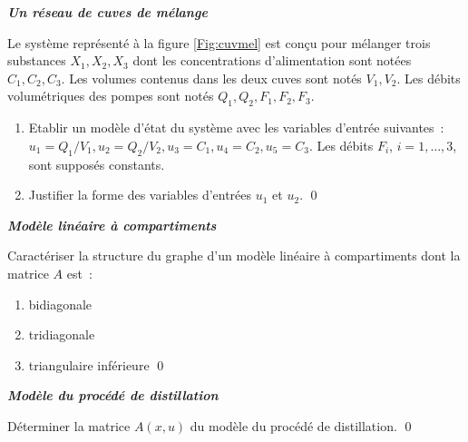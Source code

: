 \begin{exercice}{\bf \em Un réseau de cuves de mélange}

Le système représenté à la figure \ref{Fig:cuvmel} est con\c cu pour
mélanger trois substances $X_1, X_2, X_3$ dont les concentrations
d'alimentation sont notées $C_1, C_2, C_3$. Les volumes contenus
dans les deux cuves sont notés $V_1, V_2$. Les débits volumétriques
des pompes sont notés $Q_1, Q_2, F_1, F_2, F_3$.

\begin{enumerate}
\item Etablir un modèle d'état du système avec les variables
d'entrée suivantes~: $u_1 = Q_1/V_1, u_2 = Q_2/V_2, u_3 = C_1, u_4 =
C_2, u_5 = C_3$. Les débits $F_i$, $i = 1, \dots , 3$, sont supposés
constants.
\item Justifier la forme des variables d'entrées $u_1$ et $u_2$. \qed
\end{enumerate}
\end{exercice}
\vv

\begin{exercice}{\bf \em Modèle linéaire à compartiments}

Caractériser la structure du graphe d'un modèle linéaire à
compartiments dont la matrice $A$ est~:
\begin{enumerate}
\item bidiagonale
\item tridiagonale
\item triangulaire inférieure \qed
\end{enumerate}
\end{exercice}
\vv

\begin{exercice}{\bf \em Modèle du  procédé de distillation}

Déterminer la matrice $A(x,u)$ du modèle du procédé de distillation. \qed
\end{exercice}
\vv

